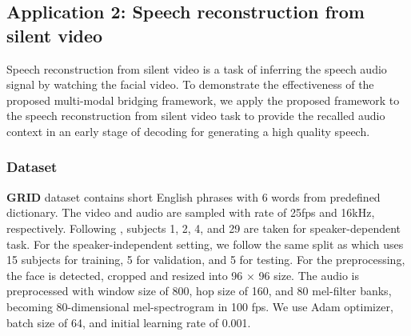 \documentclass[10pt,twocolumn,letterpaper]{article}
\begin{document}
\begin{table}[]
    \renewcommand{\arraystretch}{1.2}
	\renewcommand{\tabcolsep}{7mm}
    \vspace{0cm}
    \caption{Lip reading word accuracy comparison with visual modal inputs on LRW and LRW-1000 dataset.}
    \vspace{-0.5cm}
	\label{table:1}
\end{table}

\subsection{Application 2: Speech reconstruction from silent video} 
\label{sec:4.2}

Speech reconstruction from silent video is a task of inferring the speech audio signal by watching the facial video. To demonstrate the effectiveness of the proposed multi-modal bridging framework, we apply the proposed framework to the speech reconstruction from silent video task to provide the recalled audio context in an early stage of decoding for generating a high quality speech.
\vspace{-0.2cm}
\subsubsection{Dataset}
\vspace{-0.2cm}
{\bf GRID} dataset \cite{cooke2006grid} contains short English phrases with 6 words from predefined dictionary. The video and audio are sampled with rate of 25fps and 16kHz, respectively. Following \cite{ganbased,l2w}, subjects 1, 2, 4, and 29 are taken for speaker-dependent task. For the speaker-independent setting, we follow the same split as \cite{ganbased} which uses 15 subjects for training, 5 for validation, and 5 for testing. For the preprocessing, the face is detected, cropped and resized into 96 $\times$ 96 size. The audio is preprocessed with window size of 800, hop size of 160, and 80 mel-filter banks, becoming 80-dimensional mel-spectrogram in 100 fps. We use Adam optimizer, batch size of 64, and initial learning rate of 0.001.
\end{document}
